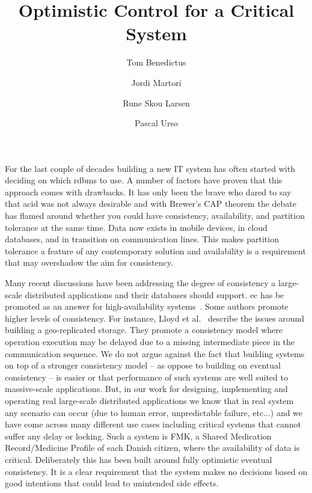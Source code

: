 \documentclass[english]{article}
\begin{document}

\title{Optimistic Control for a Critical System}

\author{Tom Benedictus \and Jordi Martori \and Rune Skou Larsen \and Pascal Urso}

\maketitle

For the last couple of decades building a new IT system has often started with deciding on which \gls{rdbms} to use. A number of factors have
proven that this approach comes with drawbacks. It has only been the brave who dared to say that \gls{acid} was not always desirable and with
Brewer's CAP theorem the debate has flamed around whether you could have consistency, availability, and partition tolerance at the same
time. Data now exists in mobile devices, in cloud databases, and in transition on communication lines. This makes partition tolerance
a feature of any contemporary solution and availability is a requirement that may overshadow the aim for consistency.

Many recent discussions have been addressing the degree of consistency a large-scale distributed applications and their databases should support. \gls{ec} has be promoted as an answer for high-availability systems~\cite{pritchett2008base}. Some authors promote higher levels of consistency. For instance, Lloyd et al.~\cite{lloyd2014dont} describe the issues around building a geo-replicated storage. They promote a consistency model where operation execution may be delayed due to a missing intermediate piece in the communication sequence. We do not argue against the fact that building systems on top of a stronger consistency model -- as oppose to building on eventual consistency -- is easier or that performance of such systems are well suited to massive-scale applications. But, in our work for designing, implementing and operating real large-scale distributed applications we know that in real system any scenario can occur (due to human error, unpredictable failure, etc...) and we have come across many different use cases including critical systems that cannot suffer any delay or locking.  Such a system is FMK, a Shared Medication Record/Medicine Profile of each Danish citizen, where the availability of data is critical. Deliberately this has been built around fully optimistic eventual consistency. It is a clear requirement that the system makes no decisions based on good intentions that could lead to unintended side effects.
\end{document}
